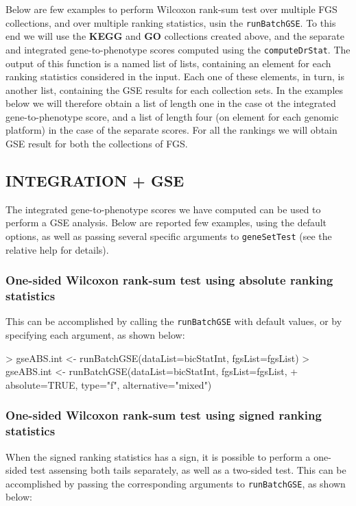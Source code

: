 \documentclass[11pt]{article}
\newcommand{\Rfunction}[1]{{\texttt{#1}}}
\begin{document}
Below are few examples to perform Wilcoxon rank-sum test over multiple FGS collections,
and over multiple ranking statistics, usin the \Rfunction{runBatchGSE}.
To this end we will use the {\bf KEGG} and {\bf GO} collections created above,
and the separate and integrated gene-to-phenotype scores computed using the
\Rfunction{computeDrStat}.
The output of this function is a named list of lists, containing an element for each
ranking statistics considered in the input. Each one of these elements, in turn,
is another list, containing the GSE results for each collection sets.
In the examples below we will therefore obtain a list of length one in the case
ot the integrated gene-to-phenotype score, and a list of length four
(on element for each genomic platform) in the case of the separate scores.
For all the rankings we will obtain GSE result for both the collections of FGS.

\subsection{INTEGRATION + GSE}
The integrated gene-to-phenotype scores we have computed can be used to
perform a GSE analysis. Below are reported few examples, using the default
options, as well as passing several specific arguments to \Rfunction{geneSetTest}
(see the relative help for details).

\subsubsection{One-sided Wilcoxon rank-sum test using absolute ranking statistics}
This can be accomplished by calling the \Rfunction{runBatchGSE} with default
values, or by specifying each argument, as shown below:

\begin{Schunk}
\begin{Sinput}
> gseABS.int <- runBatchGSE(dataList=bicStatInt, fgsList=fgsList)
> gseABS.int <- runBatchGSE(dataList=bicStatInt, fgsList=fgsList,
+ 				 absolute=TRUE, type="f", alternative="mixed")
\end{Sinput}
\end{Schunk}

\subsubsection{One-sided Wilcoxon rank-sum test using signed ranking statistics}
When the signed ranking statistics has a sign, it is possible to perform a one-sided
test assensing both tails separately, as well as a two-sided test.
This can be accomplished by passing the corresponding arguments 
to \Rfunction{runBatchGSE}, as shown below:
\end{document}
